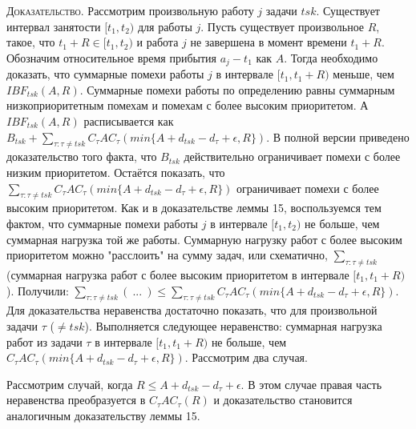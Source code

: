 \documentclass[14pt]{matmex-diploma-custom}
\begin{document}
\textsc{Доказательство.}
  Рассмотрим произвольную работу $j$ задачи $tsk$. 
  Существует интервал занятости $[t_1, t_2)$ для работы $j$. 
  Пусть существует произвольное $R$, такое, что $t_1 + R \in [t_1, t_2)$ и работа $j$ 
    не завершена в момент времени $t_1 + R$.
  Обозначим относительное время прибытия $a_j - t_1 $ как $A$.
  Тогда необходимо доказать, что суммарные помехи работы $j$ в интервале $[t_1, t_1 + R)$
    меньше, чем $IBF_{tsk}(A, R)$.
  Суммарные помехи работы по определению равны суммарным низкоприоритетным помехам и 
    помехам с более высоким приоритетом. А $IBF_{tsk}(A, R)$ расписывается как 
    $B_{tsk} + \sum_{\tau:\tau \neq tsk} C_{\tau}AC_{\tau}( min\{A + d_{tsk} - d_{\tau} + \epsilon, R\} )$.
  В полной версии приведено доказательство того факта, что $B_{tsk}$ действительно ограничивает
    помехи с более низким приоритетом. Остаётся показать, что 
    $\sum_{\tau:\tau \neq tsk} C_{\tau}AC_{\tau}( min\{A + d_{tsk} - d_{\tau} + \epsilon, R\} )$
    ограничивает помехи с более высоким приоритетом.
  Как и в доказательстве леммы 15, воспользуемся тем фактом, что суммарные помехи 
    работы $j$ в интервале $[t_1, t_2)$ не больше, чем суммарная нагрузка той же работы.
  Суммарную нагрузку работ с более высоким приоритетом можно "расслоить" на сумму задач,
    или схематично, 
    $\sum_{\tau:\tau \neq tsk}$ 
      (суммарная нагрузка работ с более высоким приоритетом в интервале $[t_1, t_1 + R)$). 
  Получили: $\sum_{\tau:\tau \neq tsk} (\ ... \ ) 
    \leq\sum_{\tau:\tau \neq tsk} C_{\tau}AC_{\tau}( min\{A + d_{tsk} - d_{\tau} + \epsilon, R\} )$.
  Для доказательства неравенства достаточно показать, что для произвольной задачи $\tau$ ($\neq tsk$). 
    Выполняется следующее неравенство: суммарная нагрузка работ из задачи $\tau$ в интервале $[t_1, t_1 + R)$
      не больше, чем $C_{\tau}AC_{\tau}( min\{A + d_{tsk} - d_{\tau} + \epsilon, R\} )$.
  Рассмотрим два случая.
  
  Рассмотрим случай, когда $R \leq A + d_{tsk} - d_{\tau} + \epsilon$. В этом случае правая часть 
    неравенства преобразуется в $C_{\tau}AC_{\tau}(R)$ и доказательство становится 
    аналогичным доказательству леммы 15.
    
\end{document}

